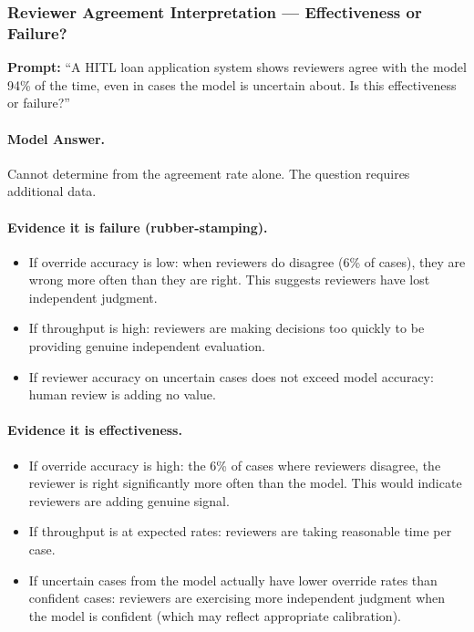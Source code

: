 \subsubsection{Reviewer Agreement Interpretation --- Effectiveness or Failure?}

\textbf{Prompt:} ``A HITL loan application system shows reviewers agree with the model 94\% of the time, even in cases the model is uncertain about. Is this effectiveness or failure?''

\paragraph{Model Answer.}

Cannot determine from the agreement rate alone. The question requires additional data.

\paragraph{Evidence it is failure (rubber-stamping).}

\begin{itemize}
    \item If override accuracy is low: when reviewers do disagree (6\% of cases), they are wrong more often than they are right. This suggests reviewers have lost independent judgment.
    \item If throughput is high: reviewers are making decisions too quickly to be providing genuine independent evaluation.
    \item If reviewer accuracy on uncertain cases does not exceed model accuracy: human review is adding no value.
\end{itemize}

\paragraph{Evidence it is effectiveness.}

\begin{itemize}
    \item If override accuracy is high: the 6\% of cases where reviewers disagree, the reviewer is right significantly more often than the model. This would indicate reviewers are adding genuine signal.
    \item If throughput is at expected rates: reviewers are taking reasonable time per case.
    \item If uncertain cases from the model actually have lower override rates than confident cases: reviewers are exercising more independent judgment when the model is confident (which may reflect appropriate calibration).
\end{itemize}


